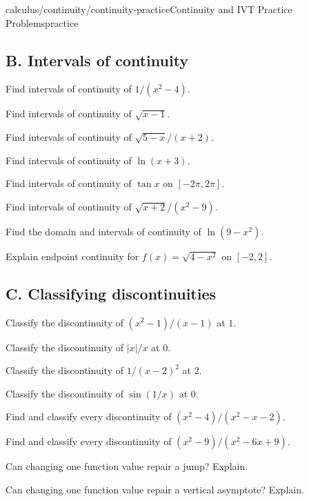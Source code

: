 \begin{webpage}{calculus/continuity/continuity-practice}{Continuity and IVT Practice Problems}{practice}
\subsection*{B. Intervals of continuity}
\begin{bgexercises}[label=\textbf{5.\arabic*},resume]
  \item Find intervals of continuity of \(1/(x^2-4)\).
  \item Find intervals of continuity of \(\sqrt{x-1}\).
  \item Find intervals of continuity of \(\sqrt{5-x}/(x+2)\).
  \item Find intervals of continuity of \(\ln(x+3)\).
  \item Find intervals of continuity of \(\tan x\) on \([-2\pi,2\pi]\).
  \item Find intervals of continuity of \(\sqrt{x+2}/(x^2-9)\).
  \item Find the domain and intervals of continuity of \(\ln(9-x^2)\).
  \item Explain endpoint continuity for \(f(x)=\sqrt{4-x^2}\) on \([-2,2]\).
\end{bgexercises}

\subsection*{C. Classifying discontinuities}
\begin{bgexercises}[label=\textbf{5.\arabic*},resume]
  \item Classify the discontinuity of \((x^2-1)/(x-1)\) at \(1\).
  \item Classify the discontinuity of \(|x|/x\) at \(0\).
  \item Classify the discontinuity of \(1/(x-2)^2\) at \(2\).
  \item Classify the discontinuity of \(\sin(1/x)\) at \(0\).
  \item Find and classify every discontinuity of \((x^2-4)/(x^2-x-2)\).
  \item Find and classify every discontinuity of \((x^2-9)/(x^2-6x+9)\).
  \item Can changing one function value repair a jump? Explain.
  \item Can changing one function value repair a vertical asymptote? Explain.
\end{bgexercises}


\end{webpage}
